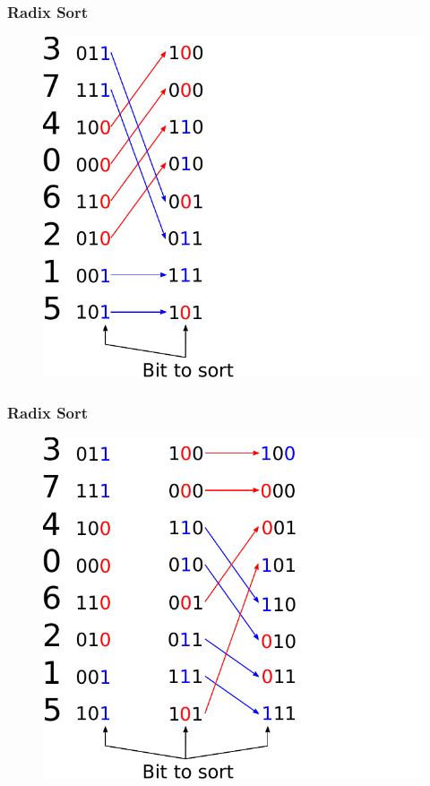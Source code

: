 \documentclass[aspectratio=169]{beamer}
\begin{document}
\frame
{
	\frametitle{Radix Sort}
	\begin{figure}
		\centering
		\includegraphics[height=0.7\textheight]{radix1}
	\end{figure}
}

\frame
{
	\frametitle{Radix Sort}
	\begin{figure}
		\centering
		\includegraphics[height=0.7\textheight]{radix2}
	\end{figure}
}
\end{document}
